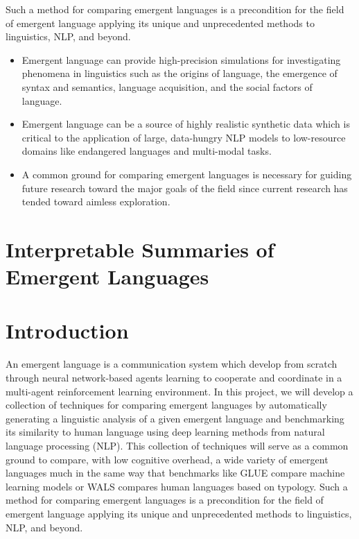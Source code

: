 \noindent
Such a method for comparing emergent languages is a precondition for the field of emergent language applying its unique and unprecedented methods to linguistics, NLP, and beyond.
\begin{itemize}
    \item Emergent language can provide high-precision simulations for investigating phenomena in linguistics such as the origins of language, the emergence of syntax and semantics, language acquisition, and the social factors of language.
    \item Emergent language can be a source of highly realistic synthetic data
        which is critical to the application of large, data-hungry NLP models to low-resource domains like endangered languages and multi-modal tasks.
    \item A common ground for comparing emergent languages is necessary for guiding future research toward the major goals of the field since current research has tended toward aimless exploration.
\end{itemize}

\newpage


\section*{Interpretable Summaries of Emergent Languages}

\section{Introduction}

An emergent language is a communication system which develop from scratch through neural network-based agents learning to cooperate and coordinate in a multi-agent reinforcement learning environment.
In this project, we will develop a collection of techniques for comparing emergent languages by automatically generating a linguistic analysis of a given emergent language and benchmarking its similarity to human language using deep learning methods from natural language processing (NLP).
This collection of techniques will serve as a common ground to compare, with low cognitive overhead, a wide variety of emergent languages much in the same way that benchmarks like GLUE \citep{wang2018glue} compare machine learning models or WALS \citep{wals} compares human languages based on typology.
Such a method for comparing emergent languages is a precondition for the field of emergent language applying its unique and unprecedented methods to linguistics, NLP, and beyond.

